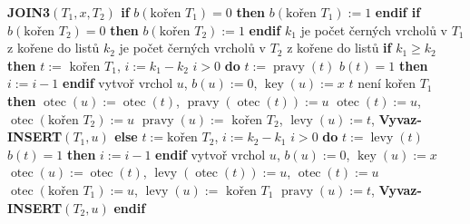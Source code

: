 \documentclass[a4paper,12pt]{article}
\DeclareMathOperator*{\otec}{otec}
\DeclareMathOperator*{\levy}{levy}
\DeclareMathOperator*{\pravy}{pravy}
\DeclareMathOperator*{\key}{key}
\begin{document}
{\bf JOIN3$(T_1,x,T_2)$\newline 
if} $b(\text{kořen }T_1)=0$ {\bf then} $b(\text{kořen }T_1)
:=1$ {\bf endif\newline 
if} $b(\text{kořen }T_2)=0$ {\bf then} $b(\text{kořen }T_2)
:=1$ {\bf endif}\newline 
$k_1$ je počet černých vrcholů v $T_1$ z kořene do listů \newline 
$k_2$ je počet černých vrcholů v $T_2$ z kořene do listů \newline 
{\bf if} $k_1\ge k_2$ {\bf then}\newline 
\phantom{---}$t:=\text{ kořen }T_1$, $i:=k_1-k_2$ \newline 
\phantom{---}{\bf while} $i>0$ {\bf do}\newline 
\phantom{------}$t:=\pravy(t)$\newline 
\phantom{------}{\bf if} $b(t)=1$ {\bf then} $i:=i-1$ {\bf endif}\newline 
\phantom{---}{\bf enddo}\newline 
\phantom{---}vytvoř vrchol $u$, $b(u):=0$, $\key(u):=x$\newline 
\phantom{---}{\bf if} $t$ není kořen $T_1$ {\bf then}\newline 
\phantom{------}$\otec(u):=\otec(t)$, $\pravy(\otec(t)):=u$\newline 
\phantom{---}{\bf endif}\newline 
\phantom{---}$\otec(t):=u$, $\otec(\text{kořen }T_2):=u$ \newline 
\phantom{---}$\pravy(u):=\text{ kořen }T_2$, $\levy(u):=t$, {\bf Vyvaz-INSERT$(T_1,u)$\newline 
else}\newline 
\phantom{---}$t:=\text{kořen }T_2$, $i:=k_2-k_1$ \newline 
\phantom{---}{\bf while} $i>0$ {\bf do}\newline 
\phantom{------}$t:=\levy(t)$\newline 
\phantom{------}{\bf if} $b(t)=1$ {\bf then} $i:=i-1$ {\bf endif}\newline 
\phantom{---}{\bf enddo}\newline 
\phantom{---}vytvoř vrchol $u$, $b(u):=0$, $\key(u):=x$ \newline 
\phantom{---}$\otec(u):=\otec(t)$, $\levy(\otec(t)):=u$, $\otec(t):=u$ \newline 
\phantom{---}$\otec(\text{kořen }T_1):=u$, $\levy(u):=\text{ kořen }T_1$ \newline 
\phantom{---}$\pravy(u):=t$, {\bf Vyvaz-INSERT}$(T_2,u)$\newline 
{\bf endif}
\end{document}
